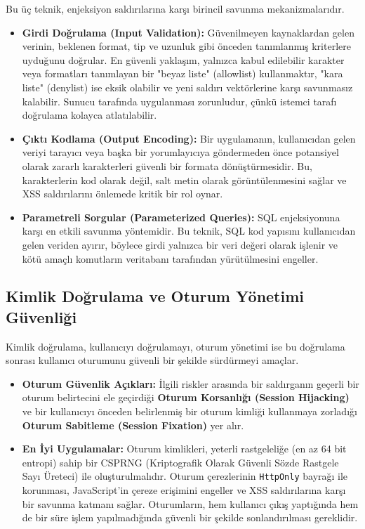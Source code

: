 Bu üç teknik, enjeksiyon saldırılarına karşı birincil savunma mekanizmalarıdır.

\begin{itemize}
\item \textbf{Girdi Doğrulama (Input Validation):} Güvenilmeyen kaynaklardan gelen verinin, beklenen format, tip ve uzunluk gibi önceden tanımlanmış kriterlere uyduğunu doğrular. En güvenli yaklaşım, yalnızca kabul edilebilir karakter veya formatları tanımlayan bir "beyaz liste" (allowlist) kullanmaktır, "kara liste" (denylist) ise eksik olabilir ve yeni saldırı vektörlerine karşı savunmasız kalabilir. Sunucu tarafında uygulanması zorunludur, çünkü istemci tarafı doğrulama kolayca atlatılabilir.
\item \textbf{Çıktı Kodlama (Output Encoding):} Bir uygulamanın, kullanıcıdan gelen veriyi tarayıcı veya başka bir yorumlayıcıya göndermeden önce potansiyel olarak zararlı karakterleri güvenli bir formata dönüştürmesidir. Bu, karakterlerin kod olarak değil, salt metin olarak görüntülenmesini sağlar ve XSS saldırılarını önlemede kritik bir rol oynar.
\item \textbf{Parametreli Sorgular (Parameterized Queries):} SQL enjeksiyonuna karşı en etkili savunma yöntemidir. Bu teknik, SQL kod yapısını kullanıcıdan gelen veriden ayırır, böylece girdi yalnızca bir veri değeri olarak işlenir ve kötü amaçlı komutların veritabanı tarafından yürütülmesini engeller.
\end{itemize}

\subsection{Kimlik Doğrulama ve Oturum Yönetimi Güvenliği}

Kimlik doğrulama, kullanıcıyı doğrulamayı, oturum yönetimi ise bu doğrulama sonrası kullanıcı oturumunu güvenli bir şekilde sürdürmeyi amaçlar.

\begin{itemize}
\item \textbf{Oturum Güvenlik Açıkları:} İlgili riskler arasında bir saldırganın geçerli bir oturum belirtecini ele geçirdiği \textbf{Oturum Korsanlığı (Session Hijacking)} ve bir kullanıcıyı önceden belirlenmiş bir oturum kimliği kullanmaya zorladığı \textbf{Oturum Sabitleme (Session Fixation)} yer alır.
\item \textbf{En İyi Uygulamalar:} Oturum kimlikleri, yeterli rastgeleliğe (en az 64 bit entropi) sahip bir CSPRNG (Kriptografik Olarak Güvenli Sözde Rastgele Sayı Üreteci) ile oluşturulmalıdır. Oturum çerezlerinin \texttt{HttpOnly} bayrağı ile korunması, JavaScript'in çereze erişimini engeller ve XSS saldırılarına karşı bir savunma katmanı sağlar. Oturumların, hem kullanıcı çıkış yaptığında hem de bir süre işlem yapılmadığında güvenli bir şekilde sonlandırılması gereklidir.
\end{itemize}


